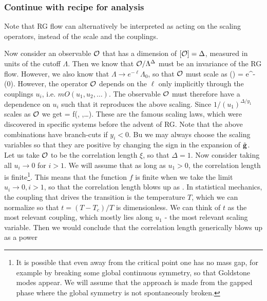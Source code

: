 \subsubsection{Continue with recipe for analysis}
Note that RG flow can alternatively be interpreted as acting on the scaling operators, instead of the scale and the couplings.













Now consider an observable $\mathcal{O}$ that has a dimension of $[\mathcal{O}]=\Delta$, measured in units of the cutoff $\Lambda$. Then we know that $\mathcal{O}/\Lambda^\Delta$ must be an invariance of the RG flow. However, we also know that $\Lambda \rightarrow e^{-\ell} \Lambda_0$, so that $\mathcal{O}$ must scale as
\be 
\mO(\ell) = e^{-\Delta \ell} \mO(0).
\ee 
However, the operator $\mathcal{O}$ depends on the $\ell$ only implicitly through the couplings $u_i$, i.e. $mO(u_1,u_2,\dots)$. The observable $\mathcal{O}$ must therefore have a dependence on $u_i$ such that it reproduces the above scaling. Since $1/(u_1)^{\Delta/y_1}$ scales as $\mathcal{O}$ we get
\be 
\label{eq:renormWilsonScalingLaws}
\mO =  f\left(,  ,\dots \right).
\ee 
These are the famous scaling laws, which were discovered in specific systems before the advent of RG. Note that the above combinations have branch-cuts if $y_i<0$. Bu we may always choose the scaling variables so that they are positive by changing the sign in the expansion of $\tilde{\mathbf{g}}$.\\
Let us take $\mathcal{O}$ to be the correlation length $\xi$, so that $\Delta=1$. Now consider taking all $u_i \rightarrow 0$ for $i>1$. We will assume that as long as $u_1>0$, the correlation length is finite\footnote{It is possible that even away from the critical point one has no mass gap, for example by breaking some global continuous symmetry, so that Goldstone modes appear. We will assume that the approach is made from the gapped phase where the global symmetry is not spontaneously broken.}. This means that the function $f$ is finite when we take the limit $u_i \rightarrow 0, i>1$, so that the correlation length blows up as
\be 
\xi \propto {}.
\ee 
In statistical mechanics, the coupling that drives the transition is the temperature $T$, which we can normalize so that $t=(T-T_c)/T$ is dimensionless. We can think of $t$ as the most relevant coupling, which mostly lies along $u_1$ - the most relevant scaling variable. Then we would conclude that the correlation length generically blows up as a power 
